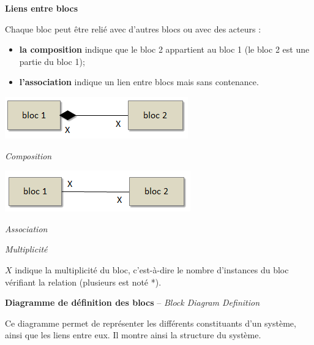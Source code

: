 \documentclass[11pt,oneside]{article}
\begin{document}
\begin{defi}
\textbf{Liens entre blocs}

Chaque bloc peut être relié avec d'autres blocs ou avec des acteurs :
\begin{itemize}
\item \textbf{la composition} indique que le bloc 2 appartient au bloc 1 (le bloc 2 est une partie du bloc 1);
\item \textbf{l'association} indique un lien entre blocs mais sans contenance. 
\end{itemize}

\begin{minipage}[c]{.45\linewidth}
\begin{center}
\includegraphics[width=.9\textwidth]{png/composition}

\textit{Composition}
\end{center}
\end{minipage}\hfill
\begin{minipage}[c]{.45\linewidth}
\begin{center}
\includegraphics[width=.9\textwidth]{png/association}

\textit{Association}
\end{center}
\end{minipage}
\end{defi}

\begin{rem}
\textit{Multiplicité}

$X$ indique la multiplicité du bloc, c’est-à-dire le nombre d’instances du bloc vérifiant la relation (plusieurs est noté *).
\end{rem}

\begin{defi}
\textbf{Diagramme de définition des blocs} --  \textit{Block Diagram Definition}

Ce diagramme permet de représenter les différents constituants d’un système, ainsi que les liens entre eux. Il montre ainsi la structure du système.
\end{defi}
\end{document}
